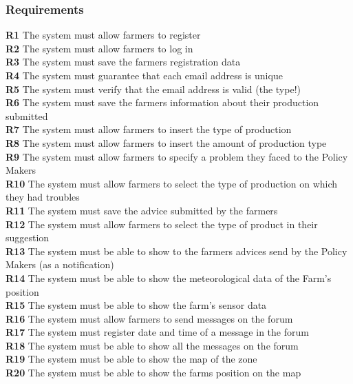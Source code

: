 \subsubsection{Requirements}
\textbf{R1} The system must allow farmers to register\\
\textbf{R2} The system must allow farmers to log in\\
\textbf{R3} The system must save the farmers registration data\\
\textbf{R4} The system must guarantee that each email address is unique\\
\textbf{R5} The system must verify that the email address is valid (the type!)\\
\textbf{R6} The system must save the farmers information about their production submitted\\
\textbf{R7} The system must allow farmers to insert the type of production \\
\textbf{R8} The system must allow farmers to insert the amount of production type\\
\textbf{R9} The system must allow farmers to specify a problem they faced to the Policy Makers\\
\textbf{R10} The system must allow farmers to select the type of production on which they had troubles\\
\textbf{R11} The system must save the advice submitted by the farmers\\
\textbf{R12} The system must allow farmers to select the type of product in their suggestion\\
\textbf{R13} The system must be able to show to the farmers advices send by the Policy Makers (as a notification)\\
\textbf{R14} The system must be able to show the meteorological data of the Farm’s position\\
\textbf{R15} The system must be able to show the farm’s sensor data \\
\textbf{R16} The system must allow farmers to send messages on the forum\\
\textbf{R17} The system must register date and time of a message in the forum\\
\textbf{R18} The system must be able to show all the messages on the forum\\
\textbf{R19} The system must be able to show the map of the zone\\
\textbf{R20} The system must be able to show the farms position on the map\\
